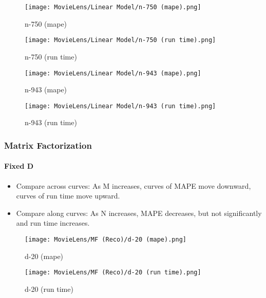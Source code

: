\documentclass[12pt]{article}
\begin{document}
\begin{figure}[H]
\centering
    \begin{minipage}{0.45\textwidth}
        \centering
        \texttt{[image: MovieLens/Linear Model/n-750 (mape).png]}
        \caption{n-750 (mape)}
        
    \end{minipage}\hfill
    \begin{minipage}{0.45\textwidth}
        \centering
        \texttt{[image: MovieLens/Linear Model/n-750 (run time).png]}
        \caption{n-750 (run time)}
    \end{minipage}
\end{figure}

\begin{figure}[H]
\centering
    \begin{minipage}{0.45\textwidth}
        \centering
        \texttt{[image: MovieLens/Linear Model/n-943 (mape).png]}
        \caption{n-943 (mape)}
        
    \end{minipage}\hfill
    \begin{minipage}{0.45\textwidth}
        \centering
        \texttt{[image: MovieLens/Linear Model/n-943 (run time).png]}
        \caption{n-943 (run time)}
    \end{minipage}
\end{figure}

\subsubsection{Matrix Factorization}

\paragraph{Fixed D}
\begin{itemize}
\item Compare across curves: As M increases, curves of MAPE move downward, curves of run time move upward.
\item Compare along curves: As N increases, MAPE decreases, but not significantly and run time increases. 
\end{itemize}

\begin{figure}[H]
\centering
    \begin{minipage}{0.45\textwidth}
        \centering
        \texttt{[image: MovieLens/MF (Reco)/d-20 (mape).png]}
        \caption{d-20 (mape)}
        
    \end{minipage}\hfill
    \begin{minipage}{0.45\textwidth}
        \centering
        \texttt{[image: MovieLens/MF (Reco)/d-20 (run time).png]}
        \caption{d-20 (run time)}
    \end{minipage}
\end{figure}
\end{document}
